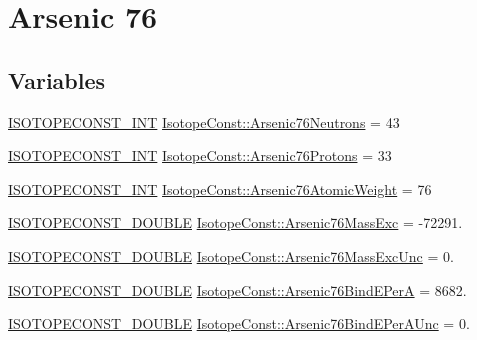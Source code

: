 \hypertarget{group___isotope_const-_arsenic-_as76}{}\section{Arsenic 76}
\label{group___isotope_const-_arsenic-_as76}
\subsection*{Variables}
\begin{DoxyCompactItemize}
\item 
\mbox{\hyperlink{group___isotope_const-_macros_ga5f18360b3e99483a35c32d789e62621c}{I\+S\+O\+T\+O\+P\+E\+C\+O\+N\+S\+T\+\_\+\+I\+NT}} \mbox{\hyperlink{group___isotope_const-_arsenic-_as76_gaa645525778e75fa74c793bab3a85589e}{Isotope\+Const\+::\+Arsenic76\+Neutrons}} = 43
\item 
\mbox{\hyperlink{group___isotope_const-_macros_ga5f18360b3e99483a35c32d789e62621c}{I\+S\+O\+T\+O\+P\+E\+C\+O\+N\+S\+T\+\_\+\+I\+NT}} \mbox{\hyperlink{group___isotope_const-_arsenic-_as76_gaa6252244e653ae48b44b9484ae6ba67e}{Isotope\+Const\+::\+Arsenic76\+Protons}} = 33
\item 
\mbox{\hyperlink{group___isotope_const-_macros_ga5f18360b3e99483a35c32d789e62621c}{I\+S\+O\+T\+O\+P\+E\+C\+O\+N\+S\+T\+\_\+\+I\+NT}} \mbox{\hyperlink{group___isotope_const-_arsenic-_as76_gae7e99f34ab9c9d0787f0f5392396ca35}{Isotope\+Const\+::\+Arsenic76\+Atomic\+Weight}} = 76
\item 
\mbox{\hyperlink{group___isotope_const-_macros_ga8f45a7272ce02c0b4c65c44636ed719a}{I\+S\+O\+T\+O\+P\+E\+C\+O\+N\+S\+T\+\_\+\+D\+O\+U\+B\+LE}} \mbox{\hyperlink{group___isotope_const-_arsenic-_as76_gae95a7a419182faca9a6590e26e76d35d}{Isotope\+Const\+::\+Arsenic76\+Mass\+Exc}} = -\/72291.
\item 
\mbox{\hyperlink{group___isotope_const-_macros_ga8f45a7272ce02c0b4c65c44636ed719a}{I\+S\+O\+T\+O\+P\+E\+C\+O\+N\+S\+T\+\_\+\+D\+O\+U\+B\+LE}} \mbox{\hyperlink{group___isotope_const-_arsenic-_as76_ga60a16e214fdaf0a4b78cf9e9a438e64b}{Isotope\+Const\+::\+Arsenic76\+Mass\+Exc\+Unc}} = 0.
\item 
\mbox{\hyperlink{group___isotope_const-_macros_ga8f45a7272ce02c0b4c65c44636ed719a}{I\+S\+O\+T\+O\+P\+E\+C\+O\+N\+S\+T\+\_\+\+D\+O\+U\+B\+LE}} \mbox{\hyperlink{group___isotope_const-_arsenic-_as76_gab1493a51d6514b32274baad005e3aa95}{Isotope\+Const\+::\+Arsenic76\+Bind\+E\+PerA}} = 8682.
\item 
\mbox{\hyperlink{group___isotope_const-_macros_ga8f45a7272ce02c0b4c65c44636ed719a}{I\+S\+O\+T\+O\+P\+E\+C\+O\+N\+S\+T\+\_\+\+D\+O\+U\+B\+LE}} \mbox{\hyperlink{group___isotope_const-_arsenic-_as76_ga494539ce77fe2104173ad7738cae9b13}{Isotope\+Const\+::\+Arsenic76\+Bind\+E\+Per\+A\+Unc}} = 0.

\end{DoxyCompactItemize}

